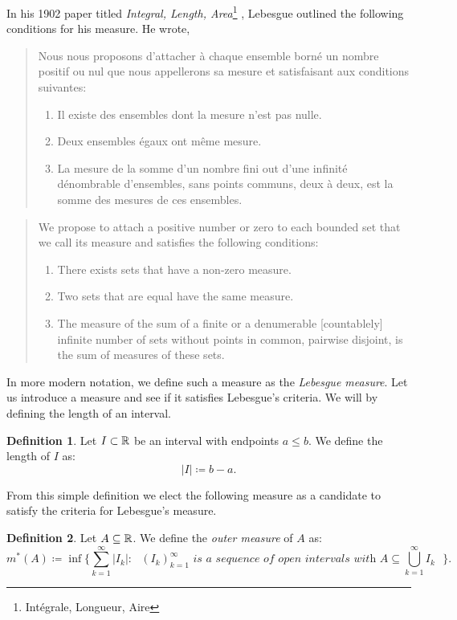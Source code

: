 \documentclass{article}
\theoremstyle{axiom} \newtheorem{axiom}{Axiom}
\theoremstyle{definition} \newtheorem{definition}{Definition}
\theoremstyle{example} \newtheorem{example}{Example}
\theoremstyle{proposition} \newtheorem{prop}{Proposition}
\theoremstyle{lemma} \newtheorem{lemma}{Lemma}
\begin{document}
In his 1902 paper titled \textit{Integral, Length, Area}\footnote{Intégrale, 
Longueur, Aire} \cite{lebesgue:1902}, Lebesgue outlined 
the following conditions for his measure. He wrote,
\begin{multicols}{2}
\begin{quote}
	Nous nous proposons d'attacher à chaque ensemble borné un nombre positif ou
	nul que nous appellerons sa mesure et satisfaisant aux conditions suivantes:
	\begin{enumerate}
		\item Il existe des ensembles dont la mesure n'est pas nulle.
		\item Deux ensembles égaux ont même mesure.
		\item La mesure de la somme d'un nombre fini out d'une infinité
		dénombrable d'ensembles, sans points communs, deux à deux, est la somme
		des mesures de ces ensembles.
	\end{enumerate}
\end{quote}

\begin{quote}
	We propose to attach a positive number or zero to each bounded set that we 
	call its measure and satisfies the following conditions:
	\begin{enumerate}
		\item There exists sets that have a non-zero measure.
		\item Two sets that are equal have the same measure.
		\item The measure of the sum of a finite or a denumerable [countablely] infinite number
		 of sets without points in common, pairwise disjoint, is the sum of
		 measures of these sets.	
	\end{enumerate}
\end{quote}
\end{multicols}

In more modern notation, we define such a measure as the \textit{Lebesgue measure}.
Let us introduce a measure and see if it satisfies Lebesgue's criteria.
We will by defining the length of an interval. 
\begin{definition}
	Let $I \subset \mathbb{R}$ be an interval with endpoints $a \leq b$. We define
	the length of $I$ as:
	\begin{equation}
		|I| \coloneqq b - a.
	\end{equation}
\end{definition}

From this simple definition we elect the following measure as a candidate to 
satisfy the criteria for Lebesgue's measure.
\begin{definition}
	Let $A \subseteq \mathbb{R}$. We define the \textit{outer measure} of $A$ as:
	\begin{equation}
		m^*(A) \coloneqq \inf \bigg\{ \sum_{k=1}^{\infty} |I_k| : \textit{ $(I_k)^\infty_{k=1}$ is a sequence of
		open intervals with $A \subseteq \bigcup_{k=1}^{\infty}I_k$ } \bigg\}.
	\end{equation}
\end{definition}
\end{document}
